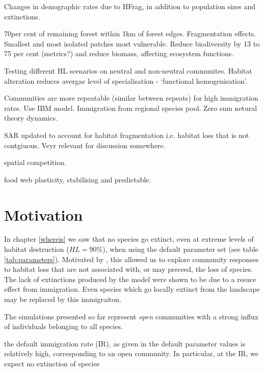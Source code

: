\begin{itemize}
\cite{korfanta2012long} Changes in demographic rates due to HFrag, in addition to population sizes and extinctions.

\cite{haddad2015habitat} 70per cent of remaining forest within 1km of forest edges. Fragmentation effects. Smallest and most isolated patches most vulnerable. Reduce biodiversity by 13 to 75 per cent (metrics?) and reduce biomass, affecting ecosystem functions. 

\cite{teyssedre2014contrasting} Testing different HL scenarios on neutral and non-neutral communites. Habitat alteration reduces avergae level of specialisation - `functional homogenisation'.

\cite{ai2012immigration} Communities are more repeatable (similar between repeats) for high immigration rates. Use IBM model. Immigration from regional species pool. Zero sum netural theory dynamics. 

\cite{hanski2013species} SAR updated to account for habitat fragmentation i.e. habitat loss that is not contgiuous. Veyr relevant for discussion somewhere.

\cite{freckleton2009measuring} spatial competition.

\cite{eveleigh2007fluctuations} food web plasticity, stabilising and predictable.

\section{Motivation}
\label{sec:motivate_immigration}

In chapter \ref{whereis} we saw that no species go extinct, even at extreme levels of habitat destruction ($HL=90\%$), when using the default parameter set (see table \ref{tab:parameters}). Motivated by \cite{tylianakis2007habitat}, this allowed us to explore community responses to habitat loss that are not associated with, or may preceed, the loss of species. The lack of extinctions produced by the model were shown to be due to a resuce effect from immigration. Even species which go locally extinct from the landscape may be replaced by this immigraiton.    

The simulations presented so far represent \emph{open} communities with a strong influx of individuals belonging to all species.

the default immigration rate (IR), as given in the default parameter values  is relatively high, corresponding to an open community. In particular, at the IR, we expect no extinction of species


\end{itemize}
